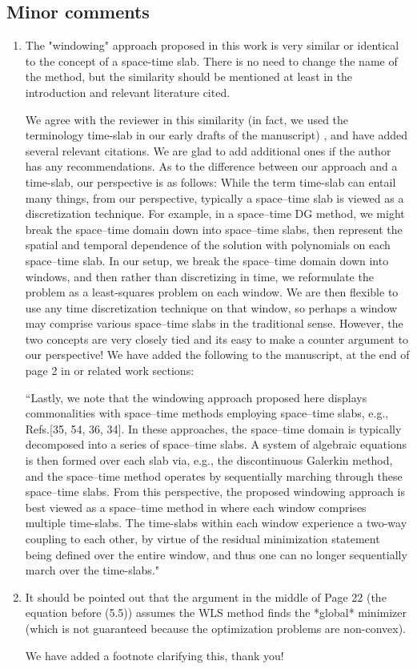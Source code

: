 \documentclass[3p,computermodern,10pt]{elsarticle}
\begin{document}
\subsection{Minor comments}
\begin{enumerate}
\item The "windowing" approach proposed in this work is very similar or identical to the concept of a space-time slab. There is no need to change the name of the method, but the similarity should be mentioned at least in the introduction and relevant literature cited.

{\color{red} We agree with the reviewer in this similarity (in fact, we used the terminology time-slab in our early drafts of the manuscript) , and have added several relevant citations. We are glad to add additional ones if the author has any recommendations. As to the difference between our approach and a time-slab, our perspective is as follows: While the term time-slab can entail many things, from our perspective, typically a space--time slab is viewed as a discretization technique. For example, in a space--time DG method, we might break the space--time domain down into space--time slabs, then represent the spatial and temporal dependence of the solution with polynomials on each space--time slab. In our setup, we break the space--time domain down into windows, and then rather than discretizing in time, we reformulate the problem as a least-squares problem on each window. We are then flexible to use any time discretization technique on that window, so perhaps a window may comprise various space--time slabs in the traditional sense. However, the two concepts are very closely tied and its easy to make a counter argument to our perspective! We have added the following to the manuscript, at the end of page 2 in or related work sections:

``Lastly, we note that the windowing approach proposed here displays commonalities with space–time methods employing space–time slabs, e.g., Refs.[35, 54, 36, 34]. In these approaches, the space–time domain is typically decomposed into a series of space–time slabs. A system of algebraic equations is then formed over each slab via, e.g., the discontinuous Galerkin method, and the space–time method operates by sequentially marching through these space–time slabs. From this perspective, the proposed windowing approach is best viewed as a space–time method in where each window comprises multiple time-slabs. The time-slabs within each window experience a two-way coupling to each other, by virtue of the residual minimization statement being defined over the entire window, and thus one can no longer sequentially march over the time-slabs."
} 
\item It should be pointed out that the argument in the middle of Page 22 (the equation before (5.5)) assumes the WLS method finds the *global* minimizer (which is not guaranteed because the optimization problems are non-convex).

{\color{red} We have added a footnote clarifying this, thank you!}
\end{enumerate}
\end{document}
